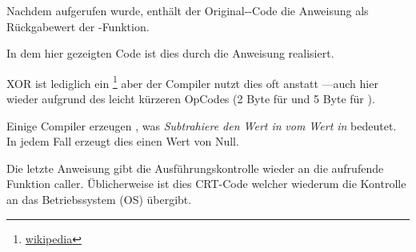 Nachdem \printf aufgerufen wurde, enthält der Original-\CCpp-Code die Anweisung  als Rückgabewert der \main-Funktion.

In dem hier gezeigten Code ist dies durch die Anweisung  realisiert.


XOR ist lediglich ein \footnote{\href{http://en.wikipedia.org/wiki/Exclusive_or}{wikipedia}} aber der Compiler nutzt dies oft anstatt
---auch hier wieder aufgrund des leicht kürzeren OpCodes (2 Byte für \XOR und 5 Byte für \MOV).

Einige Compiler erzeugen , was \emph{Subtrahiere den Wert in} \EAX \emph{vom Wert in} \EAX bedeutet.
In jedem Fall erzeugt dies einen Wert von Null.

Die letzte Anweisung \RET gibt die Ausführungskontrolle wieder an die aufrufende Funktion \gls{caller}.
Üblicherweise ist dies \CCpp \ac{CRT}-Code welcher wiederum die Kontrolle an das Betriebssystem (\ac{OS}) übergibt.
